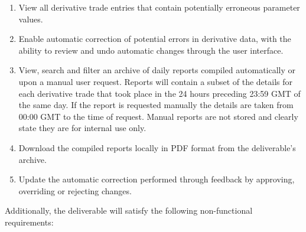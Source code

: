\documentclass[8pt]{extarticle}
\begin{document}
\begin{enumerate}[label=C\arabic*]
\item View all derivative trade entries that contain potentially erroneous parameter values. 
\item Enable automatic correction of potential errors in derivative data, with the ability to review and undo automatic changes through the user interface. 

\item View, search and filter an archive of daily reports compiled automatically or upon a manual user request. Reports will contain a subset of the details for each derivative trade that took place in the 24 hours preceding 23:59 GMT of the same day. If the report is requested manually the details are taken from 00:00 GMT to the time of request. Manual reports are not stored and clearly state they are for internal use only. 

\item Download the compiled reports locally in PDF format from the deliverable’s archive. 

\item Update the automatic correction performed through feedback by approving, overriding or rejecting changes.
\end{enumerate}

Additionally, the deliverable will satisfy the following non-functional requirements: 
\end{document}
